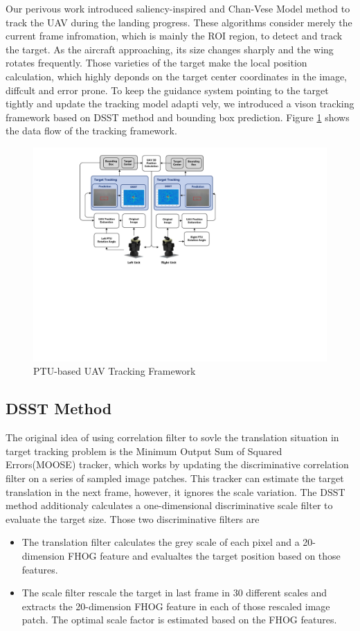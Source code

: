 \documentclass[journal,article,submit,moreauthors,pdftex,10pt,a4paper]{mdpi}
\begin{document}
Our perivous work \cite{ma2016stereo}\cite{tang2016ground}\cite{hu2016ros} introduced saliency-inspired and Chan-Vese Model method to track the UAV during the landing progress. These algorithms consider merely the current frame infromation, which is mainly the ROI region, to detect and track the target. As the aircraft approaching, its size changes sharply and the wing rotates frequently. Those varieties of the target make the local position calculation, which highly deponds on the target center coordinates in the image, diffcult and error prone. To keep the guidance system pointing to the target tightly and update the tracking model adapti vely, we introduced a vison tracking framework based on DSST method and bounding box prediction. Figure \ref{fig:11_DSST_Method} shows the data flow of the tracking framework.
%
\begin{figure}[!t]
	\centering
	\includegraphics[width=\textwidth]{Figs/11_DSST_Method.pdf}	
	\caption{PTU-based UAV Tracking Framework}
	\label{fig:11_DSST_Method}
\end{figure}
\subsection{DSST Method}
The original idea of using correlation filter to sovle the translation situation in target tracking problem is the Minimum Output Sum of Squared Errors(MOOSE)\cite{bolme2010visual} tracker, which works by updating the discriminative correlation filter on a series of sampled image patches. This tracker can estimate the target translation in the next frame, however, it ignores the scale variation. The DSST method\cite{danelljan2014accurate} additionaly calculates a one-dimensional discriminative scale filter to evaluate the target size. Those two discriminative filters are
\begin{itemize}
	\item The translation filter calculates the grey scale of each pixel and a 20-dimension FHOG feature and evalualtes the target position based on those features.
	\item The scale filter rescale the target in last frame in 30 different scales and extracts the 20-dimension FHOG feature in each of those rescaled image patch. The optimal scale factor is estimated based on the FHOG features.
\end{itemize}
\end{document}
